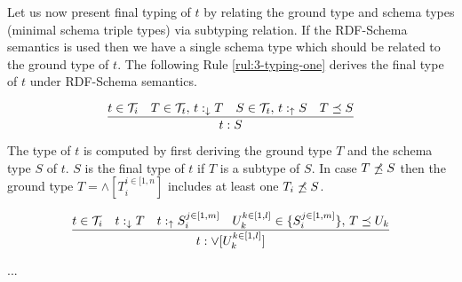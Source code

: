 \documentclass[runningheads]{llncs}
\newcommand{\darr}{\downarrow}
\newcommand{\uarr}{\uparrow}
\newcommand{\T}{{\cal T}}
\newcommand{\memo}[1]{}
\newcommand{\notes}[1]{\noindent\begin{small}-- \emph{#1}\hfill\break\end{small}}
\newcommand{\nnotes}[1]{\indent\begin{small}-- \emph{#1}\hfill\break\end{small}}
\begin{document}
Let us now present final typing of $t$ by relating the ground type and
schema types (minimal schema triple types) via subtyping relation. If
the RDF-Schema semantics is used then we have a single schema type
which should be related to the ground type of $t$. The following Rule
\ref{rul:3-typing-one} derives the final type of $t$ under RDF-Schema
semantics. 

\begin{equation}
\label{rul:3-typing-one}
\dfrac{t\in\T_i\quad T\in\T_t,\, t:_{\darr}T\quad S\in\T_t,\, t:_\uarr\/S\quad T\preceq\/S}
      {t:S}
\end{equation}

The type of $t$ is computed by first deriving the ground type $T$ and
the schema type $S$ of $t$. $S$ is the final type of $t$ if $T$ is a
subtype of $S$. In case $T\not\preceq\/S$ then the ground type
$T=\land[T_i^{i\in[1,n}]$ includes at least one $T_i\not\preceq\/S$.

\begin{equation}
\label{rul:3-typing-one}
\dfrac{t\in\T_i\quad t:_{\darr}T\quad\/t:_\uarr\/S_i^{j\in[1,m]}\quad U_k^{k\in[1,l]}\in\{S_i^{j\in[1,m]}\},\,T\preceq\/U_k}
      {t:\lor[U_k^{k\in[1,l]}]}
\end{equation}



... \\




\memo{
\notes{Why using $\land$ and $\sqcap$ types for typing a triple $t$?}
\nnotes{We would like to check typing of a triple $t\in\T_i$.}
\nnotes{We compute first the ground type $T_g=\land[T_i^{i\in[1,n]}]$ and a stored type $T_s$ of $t$.}
\nnotes{The ground type $T_g$ is computed from the ground types of $t$'s components.}
\nnotes{The subtype relation should hold $T_g\preceq\/T_s$.}

\notes{Two ways of defining semantics.}
\notes{1) enumeration style: stored types are enumerated as alternatives ($\lor$).}
\notes{2) packed together: alternative types are packed in one $\bigvee$ type.}
\notes{One advantage of (1) is that individual glb types can be processed further individually.}
\notes{Advantage of (2) is the higer-level semantics without going in implementation.}

\notes{Stored types have to be related to all join ground types to represent the correct type of a triple.}
\notes{It seems it would be easier to check the pairs one-by-one using (1) in algorithms.}
\notes{In case of using complete types in the phases, types would further have to be processed by $\land,\lor$ rules.}}
\end{document}
